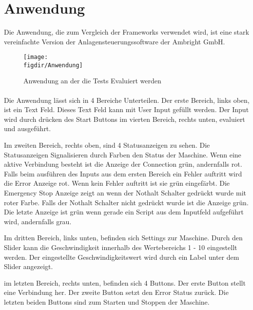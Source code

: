 		\newpage
	\section{Anwendung}
		\paragraph{} Die Anwendung, die zum Vergleich der Frameworks verwendet wird, ist eine stark vereinfachte Version der Anlagensteuerungssoftware der Ambright GmbH.  
		
		\begin{figure}[t]		
			\centering
			\texttt{[image: \\figdir/Anwendung]}
				
			\caption[Anwendung]
			{Anwendung an der die Tests Evaluiert werden}
			\label{FIG:Anwendung}
		\end{figure}
		\FloatBarrier
		
		\paragraph{} Die Anwendung lässt sich in 4 Bereiche Unterteilen. Der erste Bereich, links oben, ist ein Text Feld. Dieses Text Feld kann mit User Input gefüllt werden. Der Input wird durch drücken des Start Buttons im vierten Bereich, rechts unten, evaluiert und ausgeführt. 
		
		Im zweiten Bereich, rechts oben, sind 4 Statusanzeigen zu sehen. Die Statusanzeigen Signalisieren durch Farben den Status der Maschine. Wenn eine aktive Verbindung besteht ist die Anzeige der Connection grün, andernfalls rot. 
		Falls beim ausführen des Inputs aus dem ersten Bereich ein Fehler auftritt wird die Error Anzeige rot. Wenn kein Fehler auftritt ist sie grün eingefärbt. 
		Die Emergency Stop Anzeige zeigt an wenn der Nothalt Schalter gedrückt wurde mit roter Farbe. Falls der Nothalt Schalter nicht gedrückt wurde ist die Anzeige grün. 
		Die letzte Anzeige ist grün wenn gerade ein Script aus dem Inputfeld aufgeführt wird, andernfalls grau.
		
		Im dritten Bereich, links unten, befinden sich Settings zur Maschine. Durch den Slider kann die Geschwindigkeit innerhalb des Wertebereichs 1 - 10 eingestellt werden. Der eingestellte Geschwindigkeitswert wird durch ein Label unter dem Slider angezeigt.
		
		im letzten Bereich, rechts unten, befinden sich 4 Buttons. Der erste Button stellt eine Verbindung her. Der zweite Button setzt den Error Status zurück. Die letzten beiden Buttons sind zum Starten und Stoppen der Maschine.
		 
